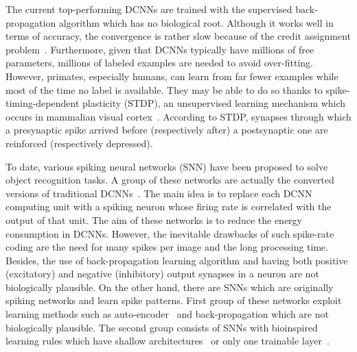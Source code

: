 \documentclass[preprint,5p,12pt,twocolumn]{article}
\begin{document}
The current top-performing DCNNs are trained with the supervised back-propagation algorithm which has no biological root. Although it works well in terms of accuracy, the convergence is rather slow because of the credit assignment problem~\cite{edmund2002computational}. Furthermore, given that DCNNs typically have millions of free parameters, millions of labeled examples are needed to avoid over-fitting.  However, primates, especially humans, can learn from far fewer examples while most of the time no label is available. They may be able to do so thanks to spike-timing-dependent plasticity (STDP), an unsupervised learning mechanism which occurs in mammalian visual cortex~\cite{meliza2006receptive,huang2014associative,mcmahon2012stimulus}. According to STDP, synapses through which a presynaptic spike arrived before (respectively after) a postsynaptic one are reinforced (respectively depressed).

To date, various spiking neural networks (SNN) have been  proposed to solve object recognition tasks. A group of these networks are actually the converted versions of traditional DCNNs~\cite{cao2015spiking,hunsberger2015spiking,diehl2016conversion}. The main idea is to replace each DCNN computing unit with a spiking neuron whose firing rate is correlated with the output of that unit.  The aim of these networks is to reduce the energy consumption in DCNNs. However, the inevitable drawbacks of such spike-rate coding are the need for many spikes per image and the long processing time. Besides, the use of back-propagation learning algorithm and having both positive (excitatory) and negative (inhibitory) output synapses in a neuron are not biologically plausible. On the other hand, there are SNNs which are originally spiking networks and learn spike patterns. First group of these networks exploit learning methods such as auto-encoder~\cite{panda2016unsupervised,burbank2015mirrored} and back-propagation\cite{bengio2015towards} which are not biologically plausible. The second group consists of SNNs with bioinspired learning rules which have shallow architectures~\cite{brader2007learning,habenschuss2012homeostatic,querlioz2013immunity,zhao2015feedforward,diehl2015unsupervised} or only one trainable layer~\cite{masquelier2007unsupervised,beyeler2013categorization,kheradpisheh2016bio}.
\end{document}
